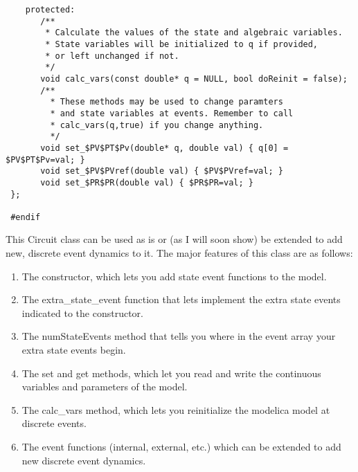 \begin{verbatim}
    protected:
       /**
        * Calculate the values of the state and algebraic variables.
        * State variables will be initialized to q if provided,
        * or left unchanged if not.
        */
       void calc_vars(const double* q = NULL, bool doReinit = false);
       /**
         * These methods may be used to change paramters
         * and state variables at events. Remember to call
         * calc_vars(q,true) if you change anything.
         */
       void set_$PV$PT$Pv(double* q, double val) { q[0] = $PV$PT$Pv=val; }
       void set_$PV$PVref(double val) { $PV$PVref=val; }
       void set_$PR$PR(double val) { $PR$PR=val; }
 };

 #endif

\end{verbatim}

This Circuit class can be used as is or (as I will soon show) be extended to add new, discrete event dynamics to it. The major features of this class are as follows:
\begin{enumerate}
\item The constructor, which lets you add state event functions to the model.
\item The extra\_state\_event function that lets implement the extra state events indicated to the constructor.
\item The numStateEvents method that tells you where in the event array your extra state events begin.
\item The set and get methods, which let you read and write the continuous variables and parameters of the model.
\item The calc\_vars method, which lets you reinitialize the modelica model at discrete events.
\item The event functions (internal, external, etc.) which can be extended to add new discrete event dynamics.
\end{enumerate}

